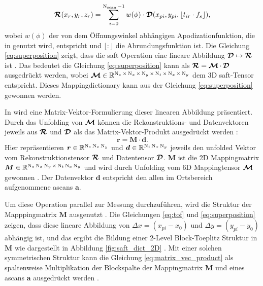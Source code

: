 \begin{equation} \label{eq:superposition}
\operatorname{\bm{\mathcal{R}}} (x_{r}, y_{r}, z_{r}) = \sum_{i = 0}^{\operatorname{N}_{\operatorname{scan}} - 1} w(\phi) \cdot  \operatorname{\bm{\mathcal{D}}} (x_{pi}, y_{pi}, \lfloor t_{ir} \cdot f_s \rfloor ),
\end{equation}
wobei $w(\phi)$ der von dem Öffnungswinkel abhängigen Apodizationfunktion, die in \cite[Gl. 2 und 3]{Krieg18ProgressiveOnline3DSAFT} genutzt wird, 
entspricht und $\lfloor : \rfloor$ die Abrundungsfunktion ist. Die Gleichung \ref{eq:superposition} zeigt, dass die \acrshort{saft} Operation eine lineare Abbildung $\operatorname{\bm{\mathcal{D}}} \mapsto \operatorname{\bm{\mathcal{R}}}$  ist \cite{Krieg18ProgressiveOnline3DSAFT}. Das bedeutet die Gleichung \ref{eq:superposition} kann als $ \operatorname{\bm{\mathcal{R}}} = \operatorname{\bm{\mathcal{M}}} \cdot \operatorname{\bm{\mathcal{D}}}$ ausgedrückt werden, wobei  $\operatorname{\bm{\mathcal{M}}} \in {\mathbb{R}}^{\operatorname{N}_z \times \operatorname{N}_x \times \operatorname{N}_y \times \operatorname{N}_t \times \operatorname{N}_x \times \operatorname{N}_y}$ dem 3D \acrshort{saft}-Tensor entspricht. Dieses Mappingdictionary kann aus der Gleichung \ref{eq:superposition} gewonnen werden. \par
In \cite{Krieg18ProgressiveOnline3DSAFT} wird eine Matrix-Vektor-Formulierung dieser linearen Abbildung präsentiert. Durch das Unfolding von $\operatorname{\bm{\mathcal{M}}}$ können die Rekonstruktions- und Datenvektoren jeweils aus $\operatorname{\bm{\mathcal{R}}}$ und $\operatorname{\bm{\mathcal{D}}}$ als das Matrix-Vektor-Produkt ausgedrückt werden \cite{Krieg18ProgressiveOnline3DSAFT}:
\begin{equation} \label{eq:matrix_vec_product}
\bm{r} = \bm{M} \cdot \bm{d}.
\end{equation}
Hier repräsentieren $\bm{r} \in {\mathbb{R}}^{\operatorname{N}_z \operatorname{N}_x \operatorname{N}_y}$ und $\bm{d} \in {\mathbb{R}}^{\operatorname{N}_t \operatorname{N}_x \operatorname{N}_y}$  jeweils den unfolded Vektor vom Rekonstruktionstensor $\operatorname{\bm{\mathcal{R}}}$ und Datentensor $\operatorname{\bm{\mathcal{D}}}$. $\bm{M}$ ist die 2D Mappingmatrix $\bm{M} \in {\mathbb{R}}^{\operatorname{N}_z\operatorname{N}_x \operatorname{N}_y \times \operatorname{N}_t \operatorname{N}_x \operatorname{N}_y}$ und wird durch Unfolding vom 6D Mappingtensor $\operatorname{\bm{\mathcal{M}}}$ gewonnen \cite{Krieg18ProgressiveOnline3DSAFT}. Der Datenvektor $\bm{d}$ entspricht den allen im Ortsbereich aufgenommene \glspl{ascan} $\bm{a}$. \par 
Um diese Operation parallel zur Messung durchzuführen, wird die Struktur der Mapppingmatrix $\bm{M}$ ausgenutzt \cite{Krieg18ProgressiveOnline3DSAFT}. Die Gleichungen \ref{eq:tof} und \ref{eq:superposition} zeigen, dass diese lineare Abbildung von $\Delta x = (x_{pi} - x_0)$ und $\Delta y = (y_{pi} - y_0)$ abhängig ist, und das ergibt die Bildung einer 2-Level Block-Toeplitz Struktur in $\bm{M}$ wie dargestellt in Abbildung \ref{fig:saft_dict_2D} \cite{Krieg18ProgressiveOnline3DSAFT}. Mit einer solchen symmetrischen Struktur kann die Gleichung \ref{eq:matrix_vec_product} als spaltenweise Multiplikation der Blockspalte der Mappingmatrix $\bm{M}$ und eines \gls{ascan}s $\bm{a}$ ausgedrückt werden \cite{Krieg18ProgressiveOnline3DSAFT}. \par
